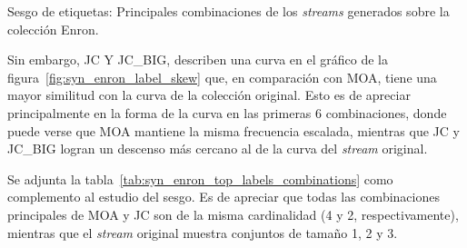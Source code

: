 \bigskip

\begin{table}[htbp]
	\centering
	\begin{adjustbox}{max width=\textwidth}
		
	\end{adjustbox}
	\caption{Sesgo de etiquetas: Principales combinaciones de los
		\textit{streams} generados sobre la colección Enron.}
	\label{tab:syn_enron_top_labels_combinations}
\end{table}
\bigskip

Sin embargo, JC Y JC\_BIG, describen una curva en el gráfico de la
figura~\ref{fig:syn_enron_label_skew} que, en comparación con MOA, tiene una
mayor similitud con la curva de la colección original. Esto es de apreciar
principalmente en la forma de la curva en las primeras 6 combinaciones, donde
puede verse que MOA mantiene la misma frecuencia escalada, mientras que JC y
JC\_BIG logran un descenso más cercano al de la curva del \textit{stream}
original.

Se adjunta la tabla~\ref{tab:syn_enron_top_labels_combinations} como
complemento al estudio del sesgo. Es de apreciar que todas las combinaciones
principales de MOA y JC son de la misma cardinalidad (4 y 2, respectivamente),
mientras que el \textit{stream} original muestra conjuntos de tamaño 1, 2 y 3.

